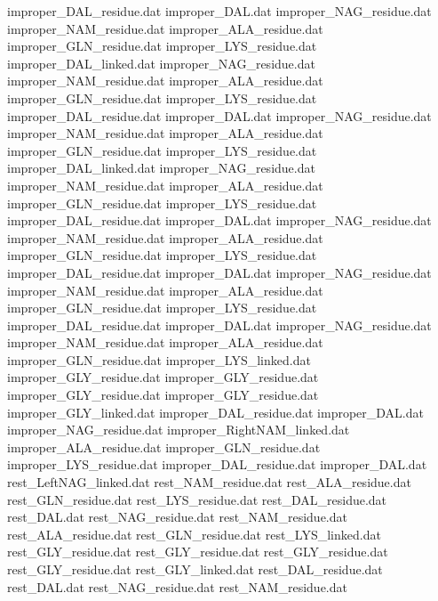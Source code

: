 improper_DAL_residue.dat        
improper_DAL.dat                
improper_NAG_residue.dat        
improper_NAM_residue.dat        
improper_ALA_residue.dat        
improper_GLN_residue.dat        
improper_LYS_residue.dat        
improper_DAL_linked.dat         
improper_NAG_residue.dat        
improper_NAM_residue.dat        
improper_ALA_residue.dat        
improper_GLN_residue.dat        
improper_LYS_residue.dat        
improper_DAL_residue.dat        
improper_DAL.dat                
improper_NAG_residue.dat        
improper_NAM_residue.dat        
improper_ALA_residue.dat        
improper_GLN_residue.dat        
improper_LYS_residue.dat        
improper_DAL_linked.dat         
improper_NAG_residue.dat        
improper_NAM_residue.dat        
improper_ALA_residue.dat        
improper_GLN_residue.dat        
improper_LYS_residue.dat        
improper_DAL_residue.dat        
improper_DAL.dat                
improper_NAG_residue.dat        
improper_NAM_residue.dat        
improper_ALA_residue.dat        
improper_GLN_residue.dat        
improper_LYS_residue.dat        
improper_DAL_residue.dat        
improper_DAL.dat                
improper_NAG_residue.dat        
improper_NAM_residue.dat        
improper_ALA_residue.dat        
improper_GLN_residue.dat        
improper_LYS_residue.dat        
improper_DAL_residue.dat        
improper_DAL.dat                
improper_NAG_residue.dat        
improper_NAM_residue.dat        
improper_ALA_residue.dat        
improper_GLN_residue.dat        
improper_LYS_linked.dat         
improper_GLY_residue.dat
improper_GLY_residue.dat
improper_GLY_residue.dat
improper_GLY_residue.dat
improper_GLY_linked.dat
improper_DAL_residue.dat        
improper_DAL.dat                
improper_NAG_residue.dat        
improper_RightNAM_linked.dat    
improper_ALA_residue.dat        
improper_GLN_residue.dat        
improper_LYS_residue.dat        
improper_DAL_residue.dat        
improper_DAL.dat                
rest_LeftNAG_linked.dat         
rest_NAM_residue.dat            
rest_ALA_residue.dat            
rest_GLN_residue.dat            
rest_LYS_residue.dat            
rest_DAL_residue.dat            
rest_DAL.dat                    
rest_NAG_residue.dat            
rest_NAM_residue.dat            
rest_ALA_residue.dat            
rest_GLN_residue.dat            
rest_LYS_linked.dat             
rest_GLY_residue.dat
rest_GLY_residue.dat
rest_GLY_residue.dat
rest_GLY_residue.dat
rest_GLY_linked.dat
rest_DAL_residue.dat            
rest_DAL.dat                    
rest_NAG_residue.dat            
rest_NAM_residue.dat            
